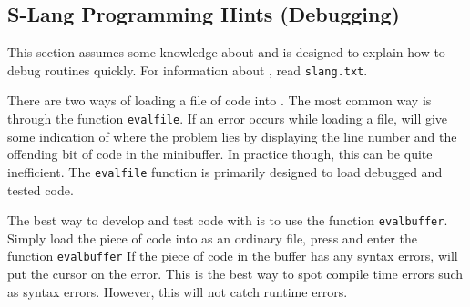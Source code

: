 \subsection{S-Lang Programming Hints (Debugging)}

  This section assumes some knowledge about \slang{} and is designed to
  explain how to debug \slang{} routines quickly.  For information about
  \slang{}, read \verb|slang.txt|.

  There are two ways of loading a file of \slang{} code into \jed{}.  The
  most common way is through the function \verb|evalfile|.  If an error
  occurs while loading a file, \jed{} will give some indication of where the
  problem lies by displaying the line number and the offending bit of
  \slang{} code in the minibuffer.  In practice though, this can be quite
  inefficient. The \verb|evalfile| function is primarily designed to load
  debugged and tested \slang{} code.

  The best way to develop and test \slang{} code with \jed{} is to use the
  function \verb|evalbuffer|.  Simply load the piece of code into \jed{} as an
  ordinary file, press  and enter the function
  \verb|evalbuffer| If the piece of code in the buffer has any syntax
  errors, \jed{} will put the cursor on the error.  This is the best way to
  spot compile time errors such as syntax errors.  However, this will not
  catch runtime errors.

